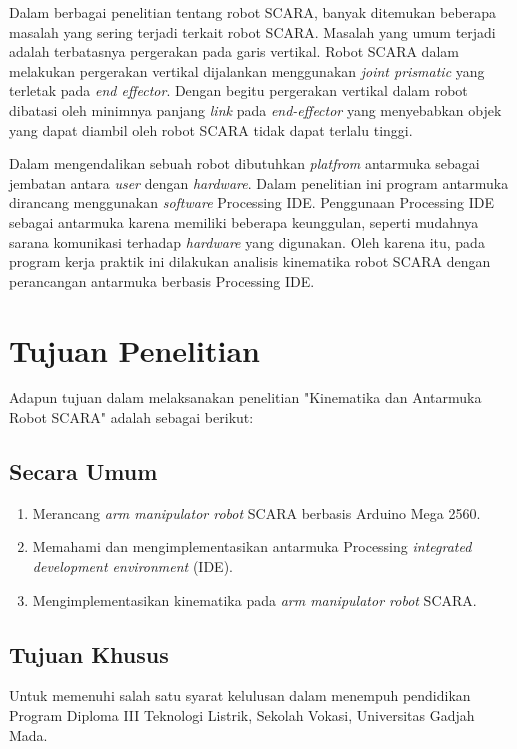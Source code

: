 	Dalam berbagai penelitian tentang robot SCARA, banyak ditemukan beberapa masalah yang sering terjadi terkait robot SCARA. Masalah yang umum terjadi adalah terbatasnya pergerakan pada garis vertikal. Robot SCARA dalam melakukan pergerakan vertikal dijalankan menggunakan \textit{joint prismatic} yang terletak pada \textit{end effector}. Dengan begitu pergerakan vertikal dalam robot dibatasi oleh minimnya panjang \textit{link} pada \textit{end-effector} yang menyebabkan objek yang dapat diambil oleh robot SCARA tidak dapat terlalu tinggi.
	
	Dalam mengendalikan sebuah robot dibutuhkan \textit{platfrom} antarmuka sebagai jembatan antara \textit{user} dengan \emph{hardware}. Dalam penelitian ini program antarmuka dirancang menggunakan \textit{software} Processing IDE. Penggunaan Processing IDE sebagai antarmuka karena memiliki beberapa keunggulan, seperti mudahnya sarana komunikasi terhadap \emph {hardware} yang digunakan. Oleh karena itu, pada program kerja praktik ini dilakukan analisis kinematika robot SCARA dengan perancangan antarmuka berbasis  Processing IDE.\\


\section{Tujuan Penelitian}
Adapun tujuan dalam melaksanakan penelitian "Kinematika dan Antarmuka Robot SCARA" adalah sebagai berikut:

	\subsection{Secara Umum}
		\begin{enumerate}
		\item Merancang\emph{ arm manipulator robot} SCARA berbasis Arduino Mega 2560.
		\item Memahami dan mengimplementasikan antarmuka Processing \textit{integrated development environment} (IDE).
		\item Mengimplementasikan kinematika pada \emph{arm manipulator robot} SCARA.
	\end{enumerate}
	\subsection{Tujuan Khusus}
	 Untuk memenuhi salah satu syarat kelulusan dalam menempuh pendidikan Program   Diploma III Teknologi Listrik, Sekolah Vokasi, Universitas Gadjah Mada. 
	
